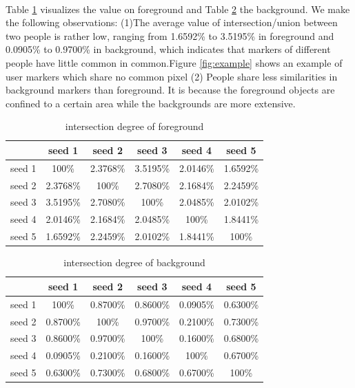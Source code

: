 \documentclass[runningheads,a4paper]{llncs}
\begin{document}
\paragraph{}Table \ref{ta:intersection degree f} visualizes the value on foreground and Table \ref{ta:intersection degree b} the background. We make the following observations: (1)The average value of intersection/union between two people is rather low, ranging from 1.6592\% to 3.5195\% in foreground and 0.0905\% to 0.9700\% in background, which indicates that markers of different people have little common in common.Figure \ref{fig:example} shows an example of user markers which share no common pixel (2) People share less similarities in background markers than foreground. It is because the foreground objects are confined to a certain area while the backgrounds are more extensive. 


\begin{table}
\centering
\begin{tabular}{|c|c|c|c|c|c|}
\hline
 & seed 1 & seed 2 & seed 3 & seed 4& seed 5 \\
\hline
seed 1 & 100\% & 2.3768\% & 3.5195\% & 2.0146\%& 1.6592\% \\
\hline
seed 2 & 2.3768\% & 100\% & 2.7080\% & 2.1684\%& 2.2459\% \\
\hline
seed 3 & 3.5195\% & 2.7080\% & 100\% & 2.0485\%& 2.0102\%\\
\hline
seed 4 & 2.0146\% & 2.1684\% & 2.0485\% & 100\%& 1.8441\% \\
\hline
seed 5 & 1.6592\% & 2.2459\% & 2.0102\% & 1.8441\%& 100\% \\
\hline
\end{tabular}
\caption{intersection degree of foreground}
\label{ta:intersection degree f}
\end{table} 

\begin{table}
\centering
\begin{tabular}{|c|c|c|c|c|c|}
\hline
  & seed 1 & seed 2 & seed 3 & seed 4& seed 5 \\
\hline
seed 1 & 100\% & 0.8700\% & 0.8600\% & 0.0905\%& 0.6300\% \\
\hline
seed 2 & 0.8700\% & 100\% & 0.9700\% & 0.2100\%& 0.7300\% \\
\hline
seed 3 & 0.8600\% & 0.9700\% & 100\% & 0.1600\%& 0.6800\%\\
\hline
seed 4 & 0.0905\% & 0.2100\% & 0.1600\% & 100\%& 0.6700\% \\
\hline
seed 5 & 0.6300\% & 0.7300\% & 0.6800\% & 0.6700\% & 100\% \\
\hline
\end{tabular}
\caption{intersection degree of background}
\label{ta:intersection degree b}
\end{table} 
\end{document}
